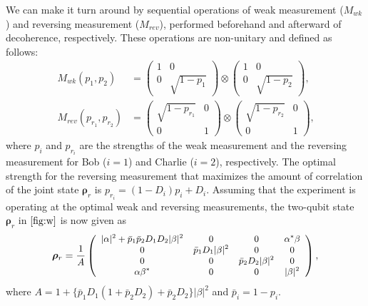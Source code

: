 \documentclass[%
 reprint,
 amsmath,amssymb,
 aps,
]{revtex4-1}
\begin{document}
We can make it turn around by sequential operations of weak measurement ($M_{wk}$) and reversing measurement ($M_{rev}$), performed beforehand and afterward of decoherence, respectively. These operations are non-unitary and defined as follows:
\begin{align*}
M_{wk} (p_1, p_2) &= \left( \begin{array}{cc}
1 & 0 \\
0 & \sqrt{1-p_1}
\end{array} \right) 
\otimes 
\left( \begin{array}{cc}
1 & 0 \\
0 & \sqrt{1-p_2}
\end{array} \right) \text{,} \\
M_{rev}(p_{r_1}, p_{r_2}) &= \left( \begin{array}{cc}
\sqrt{1-p_{r_1}} & 0 \\
0 & 1
\end{array} \right) 
\otimes 
\left( \begin{array}{cc}
\sqrt{1-p_{r_2}} & 0 \\
0 & 1
\end{array} \right) \text{,}
\end{align*}
\noindent where $p_i$ and $p_{r_i}$ are the strengths of the weak measurement and the reversing measurement for Bob ($i=1$) and Charlie ($i=2$), respectively. The optimal strength for the reversing measurement that maximizes the amount of correlation of the joint state $\boldsymbol{\rho}_r$ is $p_{r_i} = (1-D_i) p_i + D_i$. Assuming that the experiment is operating at the optimal weak and reversing measurements, the two-qubit state $\boldsymbol{\rho}_r$ in $\ref{fig:w}$ is now given as
\begin{align*}
\boldsymbol{\rho}_r = \frac{1}{\textit{A}}
\begin{small} \left( \begin{array}{cccc}
|\alpha|^2+\bar{p}_1 \bar{p}_2 D_1 D_2 |\beta|^2 & 0 & 0 & \alpha^* \beta \\
0 & \bar{p}_1 D_1 |\beta|^2 & 0 & 0 \\
0 & 0 & \bar{p}_2 D_2 |\beta|^2 & 0 \\
\alpha \beta^* & 0 & 0 & |\beta|^2 \end{array} \right) \end{small} \text{,}
\end{align*}
\noindent where $\textit{A} = 1+\{\bar{p}_1 D_1(1+\bar{p}_2 D_2)+\bar{p}_2 D_2\} |\beta|^2$ and $\bar{p}_i=1-p_i$.
\end{document}
